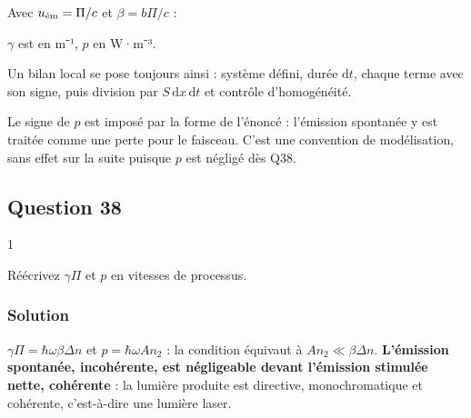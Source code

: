 \documentclass[11pt,a4paper]{article}
\newcommand{\equationajustee}[1]{%
  \sbox{\boiteequation}{$\displaystyle #1$}%
  \ifdim\wd\boiteequation>\linewidth
    \[\resizebox{\linewidth}{!}{\usebox{\boiteequation}}\]%
  \else
    \[#1\]%
  \fi}
\begin{document}
Avec \(u_{\text{\text{ém}}}=\Pi/c\) et \(\beta=b\Pi/c\) :

\equationajustee{\boxed{\frac{\partial\Pi}{\partial x}+\frac1c\frac{\partial\Pi}{\partial t}=\gamma\Pi-p}}

\equationajustee{\boxed{\begin{aligned}
\gamma(\omega)&=\frac{b\hbar\omega(n_2-n_1)}{c}\\
p(\omega)&=\hbar\omega An_2
\end{aligned}}}

\(\gamma\) est en m⁻¹, \(p\) en W·m⁻³.

\begin{methode}

Un bilan local se pose toujours ainsi : système défini, durée \(\mathrm dt\), chaque terme avec son signe, puis division par \(S\,\mathrm dx\,\mathrm dt\) et contrôle d'homogénéité.

\end{methode}

\begin{piege}

Le signe de \(p\) est imposé par la forme de l'énoncé : l'émission spontanée y est traitée comme une perte pour le faisceau. C'est une convention de modélisation, sans effet sur la suite puisque \(p\) est négligé dès Q38.

\end{piege}

\hypertarget{question-38}{%
\subsection{Question 38}\label{question-38}}

\begin{indication}{1}

Réécrivez \(\gamma\Pi\) et \(p\) en vitesses de processus.

\end{indication}

\hypertarget{solution-37}{%
\subsubsection{Solution}\label{solution-37}}

\(\gamma\Pi=\hbar\omega\beta\Delta n\) et \(p=\hbar\omega An_2\) : la condition équivaut à \(An_2\ll\beta\Delta n\). \textbf{L'émission spontanée, incohérente, est négligeable devant l'émission stimulée nette, cohérente} : la lumière produite est directive, monochromatique et cohérente, c'est-à-dire une lumière laser.
\end{document}
